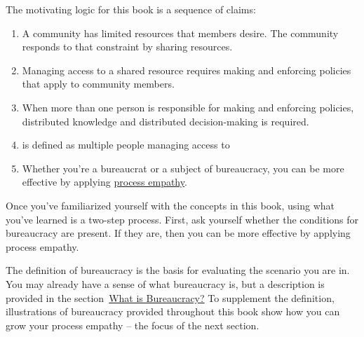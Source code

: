 The motivating logic for this book is a sequence of claims:
\begin{enumerate}
    \item A community has limited resources that members desire. The community responds to that constraint by sharing resources.
    \item Managing access to a \gls{shared resource} 
    \iftoggle{glossaryinmargin}{\marginpar{[Glossary]}}{}%
    requires making and enforcing policies that apply to community members. 
    \item When more than one person is responsible for making and enforcing policies, distributed knowledge and distributed decision-making is required. 
    \item 
\iftoggle{glossarysubstitutionworks}{\Gls{bureaucracy}}{Bureaucracy}%
\iftoggle{glossaryinmargin}{\marginpar{[Glossary]}}{} is defined as multiple people managing access to 
\iftoggle{glossarysubstitutionworks}{\glspl{shared resource}.}{shared resources.} 
    \item Whether you're a \gls{bureaucrat} 
    \iftoggle{glossaryinmargin}{\marginpar{[Glossary]}}{}%
    or a subject of bureaucracy, you can be more effective by applying \hyperref[sec:process-empathy]{process empathy}.
\end{enumerate}

Once you've familiarized yourself with the concepts in this book, using what you've learned is a two-step process. First, ask yourself whether the conditions for bureaucracy are present. If they are, then you can be more effective by applying process empathy.

The definition of bureaucracy is the basis for evaluating the scenario you are in. You may already have a sense of what bureaucracy is, but a description is provided%
\iftoggle{haspagenumbers}{on page~\pageref{sec:define-bureaucracy}}{} 
in the section~\hyperref[sec:define-bureaucracy]{What is Bureaucracy?} To supplement the definition, illustrations of bureaucracy provided throughout this book show how you can grow your process empathy -- the focus of the next section. 